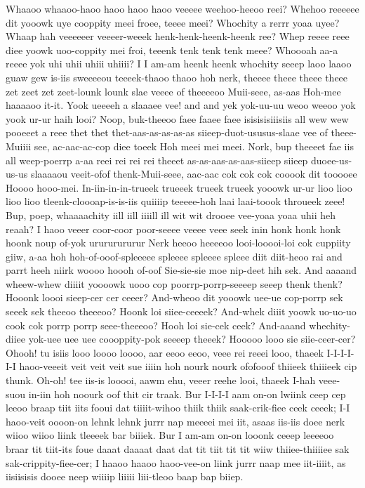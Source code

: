 \documentclass[12pt,a4paper]{article}
\begin{document}
\begin{drama}
Whaaoo whaaoo-haoo haoo haoo haoo veeeee weehoo-heeoo reei? Whehoo reeeeee dit yooowk uye cooppity meei froee, teeee meei? Whochity a rerrr yoaa uyee? Whaap hah veeeeeer veeeer-weeek henk-henk-heenk-heenk ree? Whep reeee reee diee yoowk uoo-coppity mei froi, teeenk tenk tenk tenk meee? Whoooah aa-a reeee yok uhi uhii uhiii uhiiii?
\poetspeaks
I I am-am heenk heenk whochity seeep laoo laaoo guaw gew is-iis sweeeeou teeeek-thaoo thaoo hoh nerk, theeee theee theee theee zet zeet zet zeet-lounk lounk slae veeee of theeeeoo Muii-seee, as-aas Hoh-mee haaaaoo it-it.
\pistspeaks
Yook ueeeeh a slaaaee vee! and and yek yok-uu-uu weoo weeoo yok yook ur-ur haih looi?
\poetspeaks
Noop, buk-theeoo faee faaee faee isisisisiiisiis all wew wew pooeeet a reee thet thet thet-aas-as-as-as-as siieep-duot-ususus-slaae vee of theee-Muiiii see, ac-aac-ac-cop diee toeek Hoh meei mei meei. Nork, bup theeeet fae iis all weep-poerrp a-aa reei rei rei rei theeet as-as-aas-as-aas-siieep siieep duoee-us-us-us slaaaaou veeit-ofof thenk-Muii-seee, aac-aac cok cok cok cooook dit tooooee Hoooo hooo-mei.
\pistspeaks
In-iin-in-in-trueek trueeek trueek trueek yooowk ur-ur lioo lioo lioo lioo tleenk-cloooap-is-is-iis quiiiip teeeee-hoh laai laai-toook throueek zeee! Bup, poep, whaaaachity iill iill iiiill ill wit wit drooee vee-yoaa yoaa uhii heh reaah?
\poetspeaks
I haoo veeer coor-coor poor-seeee veeee veee seek inin honk honk honk hoonk noup of-yok urururururur Nerk heeoo heeeeoo looi-looooi-loi cok cuppiity giiw, a-aa hoh hoh-of-ooof-spleeeee spleeee spleeee spleee diit diit-heoo rai and parrt heeh niirk woooo hoooh of-oof Sie-sie-sie moe nip-deet hih sek.
\pistspeaks
And aaaand wheew-whew diiiit yoooowk uooo cop poorrp-porrp-seeeep seeep thenk thenk? Hooonk loooi sieep-cer cer ceeer? And-wheoo dit yooowk uee-ue cop-porrp sek seeek sek theeoo theeeoo? Hoonk loi siiee-ceeeek? And-whek diiit yoowk uo-uo-uo cook cok porrp porrp seee-theeeoo? Hooh loi sie-cek ceek? And-aaand whechity-diiee yok-uee uee uee coooppity-pok seeeep theeek? Hooooo looo sie siie-ceer-cer?
\poetspeaks
Ohooh! tu isiis looo loooo loooo, aar eeoo eeoo, veee rei reeei looo, thaeek I-I-I-I-I-I haoo-veeeit veit veit veit sue iiiin hoh nourk nourk ofofooof thiieek thiiieek cip thunk. Oh-oh! tee iis-is looooi, aawm ehu, veeer reehe looi, thaeek I-hah veee-suou in-iin hoh noourk oof thit cir traak.
\pistspeaks
Bur I-I-I-I aam on-on lwiink ceep cep leeoo braap tiit iits fooui dat tiiiit-wihoo thiik thiik saak-crik-fiee ceek ceeek; I-I haoo-veit oooon-on lehnk lehnk jurrr nap meeeei mei iit, asaas iis-iis doee nerk wiioo wiioo liink tleeeek bar biiiek. Bur I am-am on-on looonk ceeep leeeeoo braar tit tiit-its foue daaat daaaat daat dat tit tiit tit tit wiiw thiiee-thiiiiee sak sak-crippity-fiee-cer; I haaoo haaoo haoo-vee-on liink jurrr naap mee iit-iiiit, as iisiisisis dooee neep wiiiip liiiii liii-tleoo baap bap biiep.

\end{drama}
\end{document}

